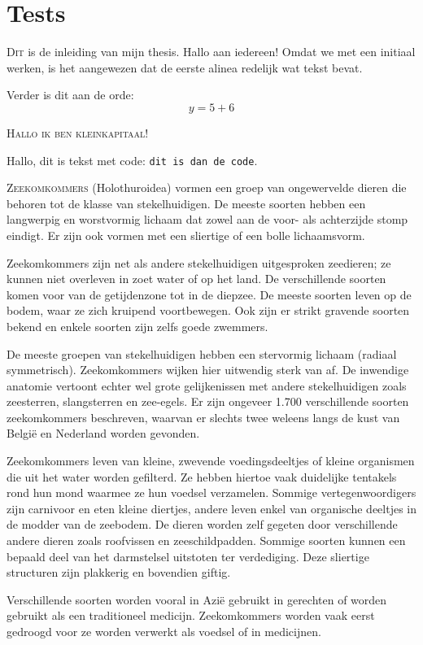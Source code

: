 \chapter{Tests}\label{ch:tests}

\lettrine{D}{it} is de inleiding van mijn thesis.
Hallo aan iedereen!
Omdat we met een initiaal werken, is het aangewezen dat de eerste alinea redelijk wat tekst bevat.


Verder is dit aan de orde:
\[
    y = 5 + 6
\]

\textsc{Hallo ik ben kleinkapitaal!}

Hallo, dit is tekst met code: \texttt{dit is dan de code}.

\lettrine{Z}{eekomkommers} (Holothuroidea) vormen een groep van ongewervelde dieren die behoren tot de klasse van stekelhuidigen.
De meeste soorten hebben een langwerpig en worstvormig lichaam dat zowel aan de voor- als achterzijde stomp eindigt.
Er zijn ook vormen met een sliertige of een bolle lichaamsvorm.

Zeekomkommers zijn net als andere stekelhuidigen uitgesproken zeedieren;
ze kunnen niet overleven in zoet water of op het land.
De verschillende soorten komen voor van de getijdenzone tot in de diepzee.
De meeste soorten leven op de bodem, waar ze zich kruipend voortbewegen.
Ook zijn er strikt gravende soorten bekend en enkele soorten zijn zelfs goede zwemmers.

De meeste groepen van stekelhuidigen hebben een stervormig lichaam (radiaal symmetrisch).
Zeekomkommers wijken hier uitwendig sterk van af.
De inwendige anatomie vertoont echter wel grote gelijkenissen met andere stekelhuidigen zoals zeesterren, slangsterren en zee-egels.
Er zijn ongeveer 1.700 verschillende soorten zeekomkommers beschreven, waarvan er slechts twee weleens langs de kust van België en Nederland worden gevonden.

Zeekomkommers leven van kleine, zwevende voedingsdeeltjes of kleine organismen die uit het water worden gefilterd.
Ze hebben hiertoe vaak duidelijke tentakels rond hun mond waarmee ze hun voedsel verzamelen.
Sommige vertegenwoordigers zijn carnivoor en eten kleine diertjes, andere leven enkel van organische deeltjes in de modder van de zeebodem.
De dieren worden zelf gegeten door verschillende andere dieren zoals roofvissen en zeeschildpadden.
Sommige soorten kunnen een bepaald deel van het darmstelsel uitstoten ter verdediging.
Deze sliertige structuren zijn plakkerig en bovendien giftig.

Verschillende soorten worden vooral in Azië gebruikt in gerechten of worden gebruikt als een traditioneel medicijn.
Zeekomkommers worden vaak eerst gedroogd voor ze worden verwerkt als voedsel of in medicijnen.

